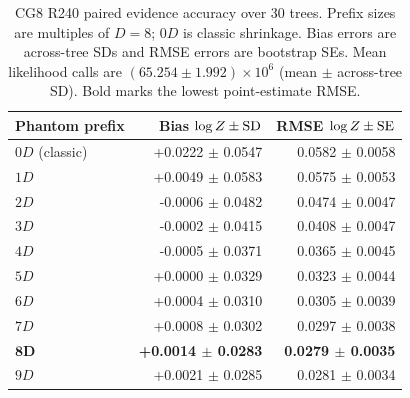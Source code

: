 \documentclass[pdflatex,sn-basic,icol]{sn-jnl}
\theoremstyle{plain}
\theoremstyle{definition}
\begin{document}
\begin{table}[t]
\caption{CG8 R240 paired evidence accuracy over 30 trees. Prefix sizes are multiples of $D=8$; $0D$ is classic shrinkage. Bias errors are across-tree SDs and RMSE errors are bootstrap SEs. Mean likelihood calls are $(65.254\pm1.992)\times10^6$ (mean $\pm$ across-tree SD). Bold marks the lowest point-estimate RMSE.}
\label{tab:phantom_evidence_cg8}
\centering
\scriptsize
\begin{tabular}{lrr}
\toprule
Phantom prefix & Bias $\log Z\mathbin{\pm}{\rm SD}$ & RMSE $\log Z\mathbin{\pm}{\rm SE}$ \\
\midrule
$0D$ (classic) & +0.0222 $\pm$ 0.0547 & 0.0582 $\pm$ 0.0058 \\
$1D$ & +0.0049 $\pm$ 0.0583 & 0.0575 $\pm$ 0.0053 \\
$2D$ & -0.0006 $\pm$ 0.0482 & 0.0474 $\pm$ 0.0047 \\
$3D$ & -0.0002 $\pm$ 0.0415 & 0.0408 $\pm$ 0.0047 \\
$4D$ & -0.0005 $\pm$ 0.0371 & 0.0365 $\pm$ 0.0045 \\
$5D$ & +0.0000 $\pm$ 0.0329 & 0.0323 $\pm$ 0.0044 \\
$6D$ & +0.0004 $\pm$ 0.0310 & 0.0305 $\pm$ 0.0039 \\
$7D$ & +0.0008 $\pm$ 0.0302 & 0.0297 $\pm$ 0.0038 \\
$\boldsymbol{8D}$ & \textbf{+0.0014 $\pm$ 0.0283} & \textbf{0.0279 $\pm$ 0.0035} \\
$9D$ & +0.0021 $\pm$ 0.0285 & 0.0281 $\pm$ 0.0034 \\
\bottomrule
\end{tabular}
\end{table}
\end{document}
